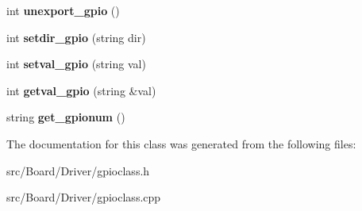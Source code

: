 \begin{DoxyCompactItemize}
int {\bfseries unexport\+\_\+gpio} ()
\item 
\mbox{\label{classGPIOClass_a51bafa7393d411f32ababfab1cf2852a}} 
int {\bfseries setdir\+\_\+gpio} (string dir)
\item 
\mbox{\label{classGPIOClass_a548c98646daa503029a2cd9f8782a6ae}} 
int {\bfseries setval\+\_\+gpio} (string val)
\item 
\mbox{\label{classGPIOClass_a56b8e3f86419ef319e91847ab2ca1ec1}} 
int {\bfseries getval\+\_\+gpio} (string \&val)
\item 
\mbox{\label{classGPIOClass_a1ebffcb1b82454f8e6648c7e9ad45659}} 
string {\bfseries get\+\_\+gpionum} ()
\end{DoxyCompactItemize}


The documentation for this class was generated from the following files\+:\begin{DoxyCompactItemize}
\item 
src/\+Board/\+Driver/gpioclass.\+h\item 
src/\+Board/\+Driver/gpioclass.\+cpp\end{DoxyCompactItemize}
